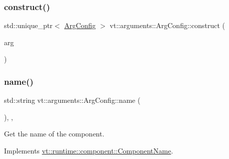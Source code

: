 \mbox{\label{structvt_1_1arguments_1_1_arg_config_a2248f3913b93ca336fdac5c2ec9c6e0b}} 
\subsubsection{\texorpdfstring{construct()}{construct()}}
{\footnotesize\ttfamily std\+::unique\+\_\+ptr$<$ \hyperlink{structvt_1_1arguments_1_1_arg_config}{Arg\+Config} $>$ vt\+::arguments\+::\+Arg\+Config\+::construct (\begin{DoxyParamCaption}\item[{std\+::unique\+\_\+ptr$<$ \hyperlink{structvt_1_1arguments_1_1_arg_config}{Arg\+Config} $>$}]{arg }\end{DoxyParamCaption})\hspace{0.3cm}{\ttfamily [static]}}

\mbox{\label{structvt_1_1arguments_1_1_arg_config_ade5e5994235f0953970fc3f460f9167a}} 
\subsubsection{\texorpdfstring{name()}{name()}}
{\footnotesize\ttfamily std\+::string vt\+::arguments\+::\+Arg\+Config\+::name (\begin{DoxyParamCaption}{ }\end{DoxyParamCaption})\hspace{0.3cm}{\ttfamily [inline]}, {\ttfamily [override]}, {\ttfamily [virtual]}}



Get the name of the component. 



Implements \hyperlink{structvt_1_1runtime_1_1component_1_1_component_name_a33c06229bb605a2b2ceff68830d6d773}{vt\+::runtime\+::component\+::\+Component\+Name}.

\mbox{\label{structvt_1_1arguments_1_1_arg_config_a124125d908a910cf52c6c59a3f0f2713}} 
